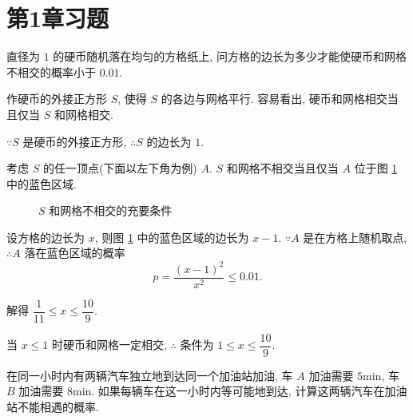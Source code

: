 \documentclass{ctexart}
\begin{document}
\section{第1章习题}
\addtocounter{exercise}{12}
\begin{exercise}%
    直径为 $1$ 的硬币随机落在均匀的方格纸上, 问方格的边长为多少才能使硬币和网格不相交的概率小于 $0.01$.
\end{exercise}
\begin{solution}
    作硬币的外接正方形 $S$, 使得 $S$ 的各边与网格平行. 容易看出, 硬币和网格相交当且仅当 $S$ 和网格相交.

    $\because S$ 是硬币的外接正方形, $\therefore S$ 的边长为 $1$.

    考虑 $S$ 的任一顶点(下面以左下角为例) $A$. $S$ 和网格不相交当且仅当 $A$ 位于图 \ref{f1.1} 中的蓝色区域.
    \begin{figure}[htbp!]
        \centering
        \caption{$S$ 和网格不相交的充要条件}\label{f1.1}
    \end{figure}

    设方格的边长为 $x$, 则图 \ref{f1.1} 中的蓝色区域的边长为 $x-1$. $\because A$ 是在方格上随机取点, $\therefore A$ 落在蓝色区域的概率
    \[p=\dfrac{(x-1)^2}{x^2}\leq0.01.\]

    解得 $\dfrac{1}{11}\leq x\leq\dfrac{10}{9}$.

    当 $x\leq1$ 时硬币和网格一定相交, $\therefore$ 条件为 $1\leq x\leq\dfrac{10}{9}$.
\end{solution}
\begin{exercise}%
    在同一小时内有两辆汽车独立地到达同一个加油站加油, 车 $A$ 加油需要 $5\text{min}$, 车 $B$ 加油需要 $8\text{min}$. 如果每辆车在这一小时内等可能地到达, 计算这两辆汽车在加油站不能相遇的概率.
\end{exercise}
\end{document}
